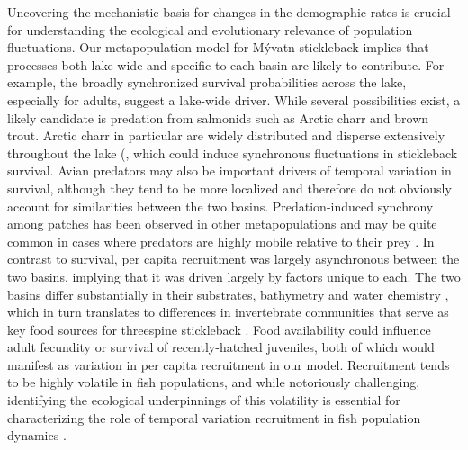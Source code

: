 \documentclass[11pt]{article}
\begin{document}
Uncovering the mechanistic basis for changes in the demographic rates
is crucial for understanding the ecological and evolutionary relevance
of population fluctuations.
Our metapopulation model for M\'{y}vatn stickleback implies that processes both lake-wide
and specific to each basin are likely to contribute.
For example, the broadly synchronized survival probabilities across the lake,
especially for adults, suggest a lake-wide driver.
While several possibilities exist,
a likely candidate is predation from salmonids such as Arctic charr and brown trout.
Arctic charr in particular are widely distributed and disperse extensively
throughout the lake (\citep[REF;][]{gudbergsson2004},
which could induce synchronous fluctuations in stickleback survival.
Avian predators may also be important drivers of temporal variation in survival,
although they tend to be more localized \citep{einarsson2004myvatn}
and therefore do not obviously account for similarities between the two basins.
Predation-induced synchrony among patches has been observed in other metapopulations
and may be quite common in cases where predators are highly mobile relative to their prey
\citep{ims2000, gilg2009}.
In contrast to survival,
per capita recruitment was largely asynchronous between the two basins,
implying that it was driven largely by factors unique to each.
The two basins differ substantially in their substrates, bathymetry and water chemistry
\citep{einarsson2004myvatn},
which in turn translates to differences
in invertebrate communities \citep{bartrons2015spatial}
that serve as key food sources for threespine stickleback \citep{gudmundsson1996}.
Food availability could influence adult fecundity or survival
of recently-hatched juveniles,
both of which would manifest as variation in per capita recruitment in our model.
Recruitment tends to be highly volatile in fish populations,
and while notoriously challenging,
identifying the ecological underpinnings of this volatility is essential
for characterizing the role
of temporal variation recruitment in fish population dynamics
\citep{dixon1999episodic, ludsin2014physical}.
\end{document}

